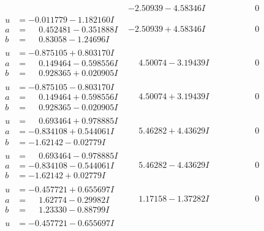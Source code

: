 \documentclass[1p]{elsarticle_modified}
\theoremstyle{definition}
\begin{document}
$$\begin{array}{c|c|c}
 & -2.50939 - 4.58346 I & \phantom{-0.000000 } 0 \\ \hline\begin{aligned}
u &= -0.011779 - 1.182160 I \\
a &= \phantom{-}0.452481 - 0.351888 I \\
b &= \phantom{-}0.83058 - 1.24696 I\end{aligned}
 & -2.50939 + 4.58346 I & \phantom{-0.000000 } 0 \\ \hline\begin{aligned}
u &= -0.875105 + 0.803170 I \\
a &= \phantom{-}0.149464 - 0.598556 I \\
b &= \phantom{-}0.928365 + 0.020905 I\end{aligned}
 & \phantom{-}4.50074 - 3.19439 I & \phantom{-0.000000 } 0 \\ \hline\begin{aligned}
u &= -0.875105 - 0.803170 I \\
a &= \phantom{-}0.149464 + 0.598556 I \\
b &= \phantom{-}0.928365 - 0.020905 I\end{aligned}
 & \phantom{-}4.50074 + 3.19439 I & \phantom{-0.000000 } 0 \\ \hline\begin{aligned}
u &= \phantom{-}0.693464 + 0.978885 I \\
a &= -0.834108 + 0.544061 I \\
b &= -1.62142 - 0.02779 I\end{aligned}
 & \phantom{-}5.46282 + 4.43629 I & \phantom{-0.000000 } 0 \\ \hline\begin{aligned}
u &= \phantom{-}0.693464 - 0.978885 I \\
a &= -0.834108 - 0.544061 I \\
b &= -1.62142 + 0.02779 I\end{aligned}
 & \phantom{-}5.46282 - 4.43629 I & \phantom{-0.000000 } 0 \\ \hline\begin{aligned}
u &= -0.457721 + 0.655697 I \\
a &= \phantom{-}1.62774 - 0.29982 I \\
b &= \phantom{-}1.23330 - 0.88799 I\end{aligned}
 & \phantom{-}1.17158 - 1.37282 I & \phantom{-0.000000 } 0 \\ \hline\begin{aligned}
u &= -0.457721 - 0.655697 I \\

\end{aligned}
\end{array}$$
\end{document}
